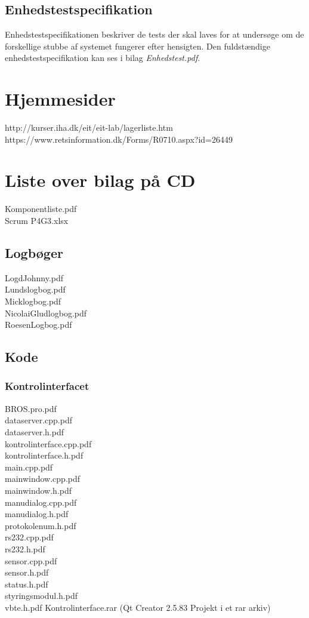 \subsection{Enhedstestspecifikation}
Enhedstestspecifikationen beskriver de tests der skal laves for at undersøge om de forskellige stubbe af systemet fungerer efter hensigten. Den fuldstændige enhedstestspecifikation kan ses i bilag \textit{Enhedstest.pdf}.

\section{Hjemmesider}
http://kurser.iha.dk/eit/eit-lab/lagerliste.htm\\
https://www.retsinformation.dk/Forms/R0710.aspx?id=26449\\

\section{Liste over bilag på CD}
Komponentliste.pdf\\
Scrum P4G3.xlsx\\
\subsection{Logbøger}
LogdJohnny.pdf\\
Lundslogbog.pdf\\
Micklogbog.pdf\\
NicolaiGludlogbog.pdf\\
RoesenLogbog.pdf\\

\subsection{Kode}
\subsubsection{Kontrolinterfacet}
BROS.pro.pdf\\
dataserver.cpp.pdf\\
dataserver.h.pdf\\
kontrolinterface.cpp.pdf\\
kontrolinterface.h.pdf\\
main.cpp.pdf\\
mainwindow.cpp.pdf\\
mainwindow.h.pdf\\
manudialog.cpp.pdf\\
manudialog.h.pdf\\
protokolenum.h.pdf\\
rs232.cpp.pdf\\
rs232.h.pdf\\
sensor.cpp.pdf\\
sensor.h.pdf\\
status.h.pdf\\
styringsmodul.h.pdf\\
vbte.h.pdf
Kontrolinterface.rar (Qt Creator 2.5.83 Projekt i et rar arkiv)\\

